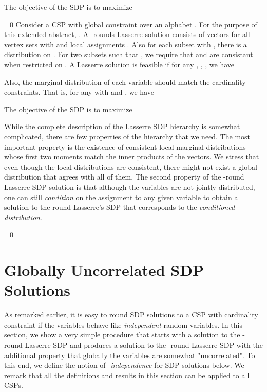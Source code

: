 \documentclass[11pt]{article}
\def\full{1}
\theoremstyle{definition}
\numberwithin{equation}{section}
\begin{document}
The objective of the SDP is to maximize



\fi
\ifnum\full=0
Consider a CSP with global constraint over an alphabet .  For the purpose of this extended abstract, .
A -rounds Lasserre solution consists of vectors  for
all vertex sets  with  and local assignments
. Also for each subset  with , there is a distribution  on . For two subsets  such that , we require that  and  are consistant when restricted on . A Lasserre solution is feasible if for any , , , we have

Also, the marginal distribution of each variable should match the cardinality constraints. That is, for any  with  and , we have

The objective of the SDP is to maximize

\fi


While the complete description of the Lasserre SDP hierarchy is
somewhat complicated, there are few properties of the hierarchy that
we need. The most
important property is the existence of consistent local
marginal distributions  whose first two
moments match the inner products of the vectors. We
stress that even though the local distributions are consistent, there
might not exist a global distribution that agrees with all of them.  The second property of the -round Lasserre SDP
solution is that although the variables are not jointly distributed,
one can still \emph{condition} on the assignment to any given
variable to obtain a solution to the  round Lasserre's SDP that
corresponds to the \emph{conditioned distribution}.


\ifnum\full=0 \vspace{-8pt}\fi
\section{Globally Uncorrelated SDP Solutions} \label{sec:uncorrelatedsol}

As remarked earlier, it is easy to round SDP solutions to a CSP with
cardinality constraint if the variables behave like {\it independent} random
variables.  In this section, we show a very simple procedure that
starts with a solution to the -round Lasserre SDP and produces
a solution to the -round Lasserre SDP with the additional property
that globally the variables are somewhat "uncorrelated".  To this end, we define the
notion of {\it -independence} for SDP solutions below.
We remark that all the definitions and results in this section can be applied to all CSPs.
\end{document}
